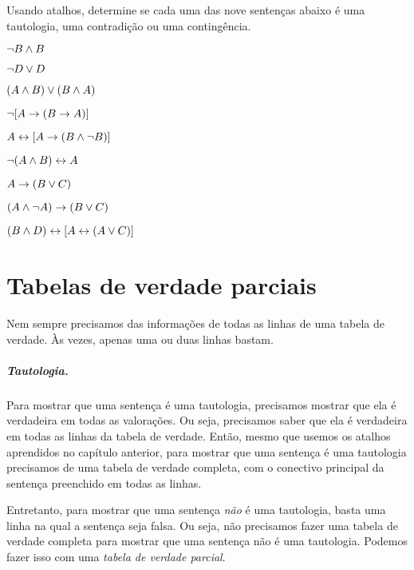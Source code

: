 \practiceproblems
\problempart
\label{pr.TT.TTorC2}
Usando atalhos, determine se cada uma das nove sentenças abaixo é uma tautologia, uma contradição ou uma contingência.
\begin{earg}
\item $\neg B \wedge B$ %
\item $\neg D \vee D$ %
\item $(A\wedge B) \vee (B\wedge A)$ %
\item $\neg[A \rightarrow (B \rightarrow A)]$ %
\item $A \leftrightarrow [A \rightarrow (B \wedge \neg B)]$ %
\item $\neg(A\wedge B) \leftrightarrow A$ %
\item $A\rightarrow(B\vee C)$ %
\item $(A \wedge\neg A) \rightarrow (B \vee C)$ %
\item $(B\wedge D) \leftrightarrow [A \leftrightarrow(A \vee C)]$%
\end{earg}


\chapter{Tabelas de verdade parciais}\label{s:PartialTruthTable}

Nem sempre precisamos das informações de todas as linhas de uma tabela de verdade.
Às vezes, apenas uma ou duas linhas bastam.

\paragraph{Tautologia.} 
Para mostrar que uma sentença é uma tautologia, precisamos mostrar que ela é verdadeira em todas as valorações.
Ou seja, precisamos saber que ela é verdadeira em todas as linhas da tabela de verdade.
Então, mesmo que usemos os atalhos aprendidos no capítulo anterior, para mostrar que uma sentença é uma tautologia precisamos de uma tabela de verdade completa, com o conectivo principal da sentença preenchido em todas as linhas.

Entretanto, para mostrar que uma sentença \emph{não} é uma tautologia, basta uma linha na qual a sentença seja falsa.
Ou seja, não precisamos fazer uma tabela de verdade completa para mostrar que uma sentença não é uma tautologia.
Podemos fazer isso  com uma \emph{tabela de verdade parcial}.


